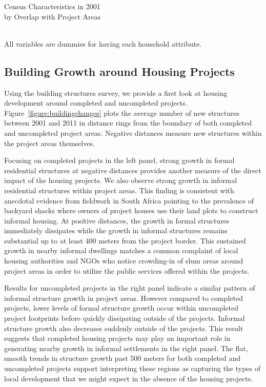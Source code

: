 \documentclass[12pt]{article}
\begin{document}
\begin{table}
\caption{Census Characteristics in 2001 \\ by Overlap with Project Areas}\label{table:censusdescriptives}
\centering
 \\
All variables are dummies for having each household attribute.
\end{table}

\subsection{Building Growth around Housing Projects}

Using the building structures survey, we provide a first look at housing development around completed and uncompleted projects.  Figure~\ref{figure:buildingchanges} plots the average number of new structures between 2001 and 2011 in distance rings from the boundary of both completed and uncompleted project areas.  Negative distances measure new structures within the project areas themselves.  

Focusing on completed projects in the left panel, strong growth in formal residential structures at negative distances provides another measure of the direct impact of the housing projects.  We also observe strong growth in informal residential structures within project areas.  This finding is consistent with anecdotal evidence from fieldwork in South Africa pointing to the prevalence of backyard shacks where owners of project houses use their land plots to construct informal housing.  At positive distances, the growth in formal structures immediately dissipates while the growth in informal structures remains substantial up to at least 400 meters from the project border.  This sustained growth in nearby informal dwellings matches a common complaint of local housing authorities and NGOs who notice crowding-in of slum areas around project areas in order to utilize the public services offered within the projects.  	

Results for uncompleted projects in the right panel indicate a similar pattern of informal structure growth in project areas.  However compared to completed projects, lower levels of formal structure growth occur within uncompleted project footprints before quickly dissipating outside of the projects.  Informal structure growth also decreases suddenly outside of the projects.  This result suggests that completed housing projects may play an important role in generating nearby growth in informal settlements in the right panel.  The flat, smooth trends in structure growth past 500 meters for both completed and uncompleted projects support interpreting these regions as capturing the types of local development that we might expect in the absence of the housing projects.
\end{document}
